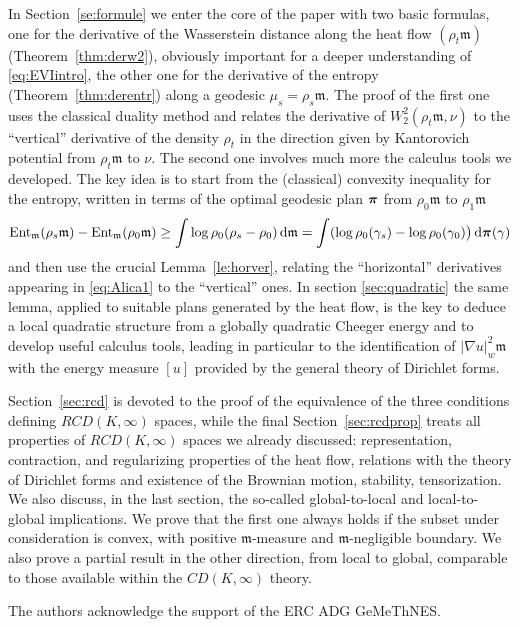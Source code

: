 \documentclass[reqno,11pt]{article}
\numberwithin{equation}{section}
\newcommand{\mm}{{\mbox{\boldmath$m$}}}
\newcommand{\ppi}{{\mbox{\boldmath$\pi$}}}
\renewcommand{\d}{{\mathrm d}}
\newcommand{\weakgrad}[1]{|\nabla #1|_w}                %
\newcommand{\entr}[2]{{\rm Ent}_{#2}(#1)}              %
\newcommand{\rcd}[2]{RCD(#1,#2)}
\renewcommand{\mm}{\mathfrak m}
\begin{document}
In Section~\ref{se:formule} we enter the core of the paper with two
basic formulas, one for the derivative of the Wasserstein distance
along the heat flow $(\rho_t\mm)$ (Theorem~\ref{thm:derw2}),
obviously important for a deeper understanding of
\eqref{eq:EVIintro}, the other one for the derivative of the entropy
(Theorem~\ref{thm:derentr}) along a geodesic $\mu_s=\rho_s\mm$. The
proof of the first one uses the classical duality method and relates
the derivative of $W_2^2(\rho_t\mm,\nu)$ to the ``vertical''
derivative of the density $\rho_t$ in the direction given by
Kantorovich potential from $\rho_t\mm$ to $\nu$. The second one
involves much more the calculus tools we developed. The key idea is
to start from the (classical) convexity inequality for the entropy,
written in terms of the optimal geodesic plan $\ppi$ from
$\rho_0\mm$ to $\rho_1\mm$
\begin{equation}\label{eq:Alica1}
\entr{\rho_s\mm}{\mm}-\entr{\rho_0\mm}{\mm}\geq\int\log\rho_0(\rho_s-\rho_0)\,\d\mm=
\int
(\log\rho_0(\gamma_s)-\log\rho_0(\gamma_0)\bigr)\,\d\ppi(\gamma)
\end{equation}
and then use the crucial Lemma~\ref{le:horver}, relating the
``horizontal'' derivatives appearing in \eqref{eq:Alica1} to the
``vertical'' ones. In section \ref{sec:quadratic} the same lemma,
applied to suitable plans generated by the heat flow, is the key to
deduce a local quadratic structure from a globally quadratic Cheeger
energy and to develop useful calculus tools, leading in particular
to the identification of $\weakgrad u^2\mm$ with the energy measure
$[u]$ provided by the general theory of Dirichlet forms.

Section~\ref{sec:rcd} is devoted to the proof of the equivalence of
the three conditions defining $\rcd K \infty$ spaces, while the
final Section~\ref{sec:rcdprop} treats all properties of $\rcd
K\infty$ spaces we already discussed: representation, contraction,
and regularizing properties of the heat flow, relations with the
theory of Dirichlet forms and existence of the Brownian motion,
stability, tensorization. We also discuss, in the last section, the
so-called global-to-local and local-to-global implications. We prove
that the first one always holds if the subset under consideration is
convex, with positive $\mm$-measure and $\mm$-negligible boundary.
We also prove a partial result in the other direction, from local to
global, comparable to those available within the $CD(K,\infty)$
theory.

\smallskip
{} The authors acknowledge the support
of the ERC ADG GeMeThNES.
\end{document}
